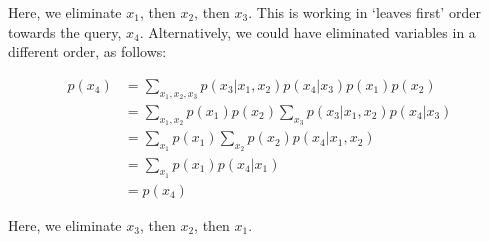 \documentclass[12pt]{article}
\begin{document}
Here, we eliminate $x_1$, then $x_2$, then $x_3$. This is working in
`leaves first' order towards the query, $x_4$.  Alternatively, we
could have eliminated variables in a different order, as follows:

\begin{align}
p(x_4) &= \sum_{x_1, x_2, x_3}p(x_3 | x_1, x_2)p(x_4 | x_3)p(x_1)p(x_2) \\
&= \sum_{x_1, x_2}p(x_1)p(x_2)\sum_{x_3}p(x_3 | x_1, x_2)p(x_4 | x_3) \\
&= \sum_{x_1}p(x_1)\sum_{x_2}p(x_2)p(x_4 | x_1, x_2)\\
&= \sum_{x_1}p(x_1)p(x_4 | x_1)\\
&= p(x_4)
\end{align}

Here, we eliminate $x_3$, then $x_2$, then $x_1$.

\newpage
\end{document}
